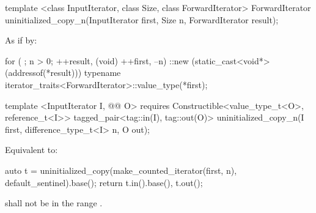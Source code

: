 {\color{remclr}
\begin{codeblock}
template <class InputIterator, class Size, class ForwardIterator>
  ForwardIterator uninitialized_copy_n(InputIterator first, Size n,
                                       ForwardIterator result);
\end{codeblock}

\setcounter{Paras}{2}
\pnum
\effects As if by:
\begin{codeblock}
        for ( ; n > 0; ++result, (void) ++first, --n) {
          ::new (static_cast<void*>(addressof(*result)))
            typename iterator_traits<ForwardIterator>::value_type(*first);
        }
\end{codeblock}

\pnum
\returns {}
} %

{\color{addclr}
\begin{codeblock}
template <InputIterator I, @@ O>
  requires
Constructible<value_type_t<O>, reference_t<I>>
  tagged_pair<tag::in(I), tag::out(O)> uninitialized_copy_n(I first, difference_type_t<I> n, O out);
\end{codeblock}

\setcounter{Paras}{4}
\pnum
\effects Equivalent to:
\begin{codeblock}
    auto t = uninitialized_copy(make_counted_iterator(first, n), default_sentinel{}).base();
    return {t.in().base(), t.out()};
\end{codeblock}

\pnum
\requires {} shall not be in the range .
} %

